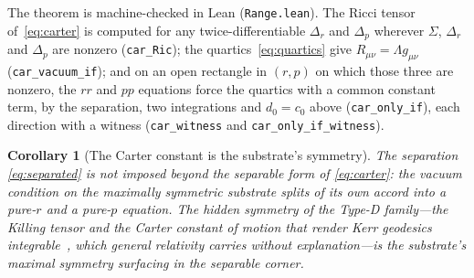 \documentclass[11pt,a4paper]{article}
\newtheorem{corollary}[theorem]{Corollary}
\theoremstyle{definition}
\begin{document}
The theorem is machine-checked in Lean (\texttt{Range.lean}). The Ricci tensor of~\eqref{eq:carter} is computed for any twice-differentiable $\Delta_{r}$ and $\Delta_{p}$ wherever $\Sigma$, $\Delta_{r}$ and $\Delta_{p}$ are nonzero (\texttt{car\_Ric}); the quartics~\eqref{eq:quartics} give $R_{\mu\nu}=\Lambda g_{\mu\nu}$ (\texttt{car\_vacuum\_if}); and on an open rectangle in $(r,p)$ on which those three are nonzero, the $rr$ and $pp$ equations force the quartics with a common constant term, by the separation, two integrations and $d_{0}=c_{0}$ above (\texttt{car\_only\_if}), each direction with a witness (\texttt{car\_witness} and \texttt{car\_only\_if\_witness}).

\begin{corollary}[The Carter constant is the substrate's symmetry]\label{cor:carter}
The separation \eqref{eq:separated} is not imposed beyond the separable form of \eqref{eq:carter}: the vacuum condition on the maximally symmetric substrate splits of its own accord into a pure-$r$ and a pure-$p$ equation. The hidden symmetry of the Type-D family---the Killing tensor and the Carter constant of motion that render Kerr geodesics integrable~\cite{WalkerPenrose1970}, which general relativity carries without explanation---is the substrate's maximal symmetry surfacing in the separable corner.
\end{corollary}
\end{document}
